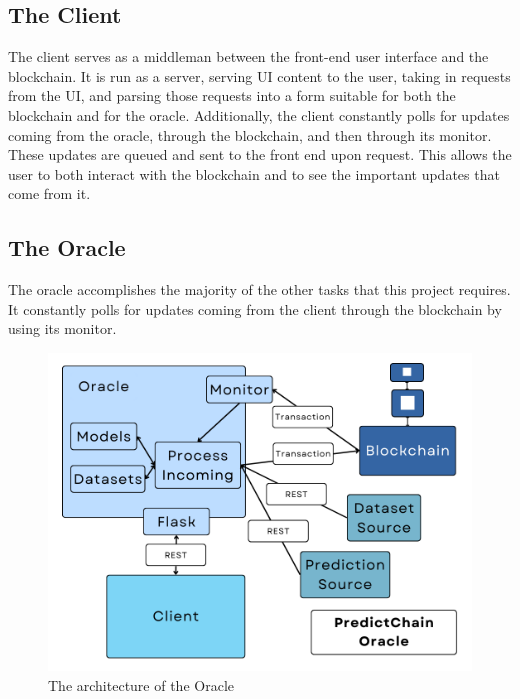 \documentclass{ledger}
\begin{document}
\subsection{The Client}

The client serves as a middleman between the front-end user interface and the blockchain.  It is run as a server,
serving UI content to the user, taking in requests from the UI, and parsing those requests into a form suitable for both
the blockchain and for the oracle.  Additionally, the client constantly polls for updates coming from the oracle, through
the blockchain, and then through its monitor.  These updates are queued and sent to the front end upon request. This allows
the user to both interact with the blockchain and to see the important updates that come from it.

\subsection{The Oracle}
\label{subsec:oracle}

The oracle accomplishes the majority of the other tasks that this project requires.  It constantly polls for updates
coming from the client through the blockchain by using its monitor.

\begin{figure}[H]
    \begin{center}
        \begin{minipage}{0.6\textwidth}
        \centering
        \includegraphics[width=\linewidth]{images/oracleDiagram}
        \caption{The architecture of the Oracle}\label{Fig:oracleDiagram}
    \end{minipage}\hfill
    \end{center}
\end{figure}
\end{document}
